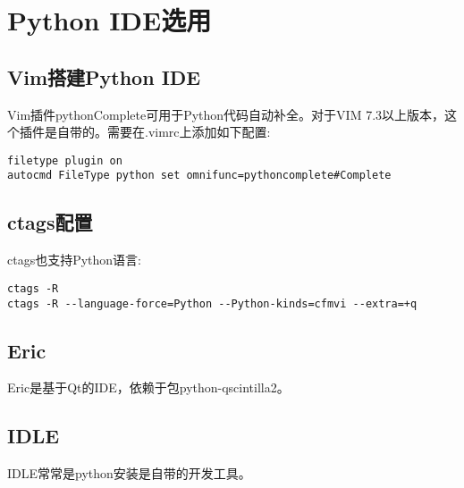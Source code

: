 \section{Python IDE选用}

\subsection{Vim搭建Python IDE}
Vim插件pythonComplete可用于Python代码自动补全。对于VIM 7.3以上版本，这个插件是自带的。需要在.vimrc上添加如下配置:
\begin{verbatim}
filetype plugin on  
autocmd FileType python set omnifunc=pythoncomplete#Complete  
\end{verbatim}

\subsection{ctags配置}
ctags也支持Python语言:
\begin{verbatim}
ctags -R
ctags -R --language-force=Python --Python-kinds=cfmvi --extra=+q
\end{verbatim}

\subsection{Eric}
Eric是基于Qt的IDE，依赖于包python-qscintilla2。

\subsection{IDLE}
IDLE常常是python安装是自带的开发工具。

